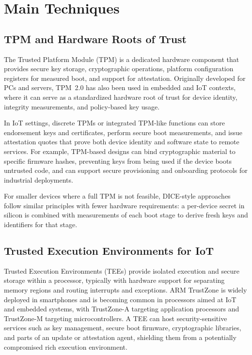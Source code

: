 \documentclass[conference,11pt,a4paper]{IEEEtran}
\begin{document}
\section{Main Techniques}
\label{sec:techniques}

\subsection{TPM and Hardware Roots of Trust}
The Trusted Platform Module (TPM) is a dedicated hardware component that provides secure key storage, cryptographic operations, platform configuration registers for measured boot, and support for attestation. Originally developed for PCs and servers, TPM~2.0 has also been used in embedded and IoT contexts, where it can serve as a standardized hardware root of trust for device identity, integrity measurements, and policy-based key usage.\cite{tcg_tpm_iot}

In IoT settings, discrete TPMs or integrated TPM-like functions can store endorsement keys and certificates, perform secure boot measurements, and issue attestation quotes that prove both device identity and software state to remote services. For example, TPM-based designs can bind cryptographic material to specific firmware hashes, preventing keys from being used if the device boots untrusted code, and can support secure provisioning and onboarding protocols for industrial deployments.\cite{tcg_tpm_iot,tcg_iot}

For smaller devices where a full TPM is not feasible, DICE-style approaches follow similar principles with fewer hardware requirements: a per-device secret in silicon is combined with measurements of each boot stage to derive fresh keys and identifiers for that stage.

\subsection{Trusted Execution Environments for IoT}
Trusted Execution Environments (TEEs) provide isolated execution and secure storage within a processor, typically with hardware support for separating memory regions and routing interrupts and exceptions.\cite{tee_trustcom} ARM TrustZone is widely deployed in smartphones and is becoming common in processors aimed at IoT and embedded systems, with TrustZone-A targeting application processors and TrustZone-M targeting microcontrollers.\cite{tzm_runtime,tzm_framework} A TEE can host security-sensitive services such as key management, secure boot firmware, cryptographic libraries, and parts of an update or attestation agent, shielding them from a potentially compromised rich execution environment.
\end{document}
